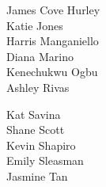 \documentclass{article}[10pt]
\begin{document}
\begin{center}
{\begin{multicols*}{3}
\begin{center}
\begin{small}
                        {James Cove Hurley}\\
                        {Katie Jones}\\
                        {Harris Manganiello}\\
                        {Diana Marino}\\
                        {Kenechukwu Ogbu}\\
                        {Ashley Rivas}\vfill\null
                        \columnbreak

                        {Kat Savina}\\
                        {Shane Scott}\\
                        {Kevin Shapiro}\\
                        {Emily Sleasman}\\
                        {Jasmine Tan}
                    \end{small}
                \end{center}
            \end{multicols*}
        }
    \end{center}

    \pagebreak

\end{document}
